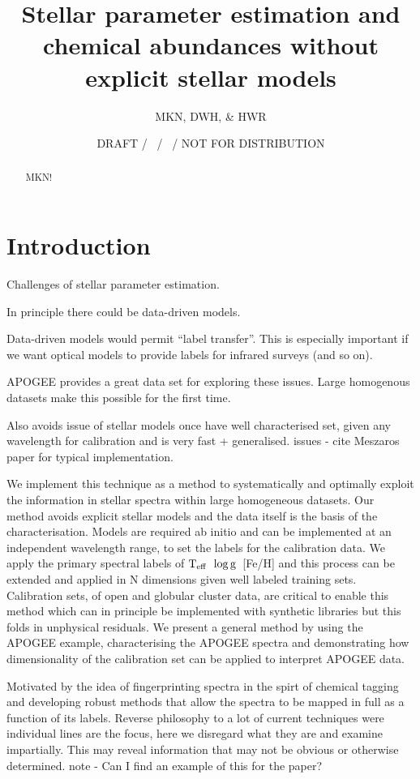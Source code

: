 \documentclass[12pt, preprint]{aastex}
\newcommand{\teff}{\mbox{$\rm T_{eff}$}}
\newcommand{\logg}{\mbox{$\rm \log g$}}
\begin{document}
\title{Stellar parameter estimation and chemical abundances without explicit stellar models}
\author{
  MKN,
  DWH,
  \&
  HWR}
\date{DRAFT / \gitdate\ / \githash\ / NOT FOR DISTRIBUTION}

\begin{abstract}
MKN!
\end{abstract}

\section{Introduction}

Challenges of stellar parameter estimation.

In principle there could be data-driven models.

Data-driven models would permit ``label transfer''.
This is especially important if we want optical models to provide labels for infrared surveys (and so on).

APOGEE provides a great data set for exploring these issues. Large homogenous datasets make this possible for the first time. 

Also avoids issue of stellar models once have well characterised set, given any wavelength for calibration and is very fast + generalised. 
issues - cite Meszaros paper for typical implementation. 

We implement this technique as a method to systematically and optimally exploit the information in stellar spectra within large homogeneous datasets.  Our method avoids explicit stellar models and the data itself is the basis of the characterisation. Models are required ab initio and can be implemented at an independent wavelength range, to set the labels for the calibration data.  We apply the primary spectral labels of \teff\, \logg\, [Fe/H] and this process can be extended and applied in N dimensions given well labeled training sets. Calibration sets, of open and globular cluster data, are critical to enable this method which can in principle be implemented with synthetic libraries but this folds in unphysical residuals. We present a general method by using the APOGEE example, characterising the APOGEE spectra and demonstrating how dimensionality of the calibration set can be applied to interpret APOGEE data. 

Motivated by the idea of fingerprinting spectra in the spirt of chemical tagging and developing robust methods that allow the spectra to be mapped in full as a function of its labels. Reverse philosophy to a lot of current techniques were individual lines are the focus, here we disregard what they are and examine impartially. This may reveal information that may not be obvious or otherwise determined. note - Can I find an example of this for the paper? 
\end{document}
